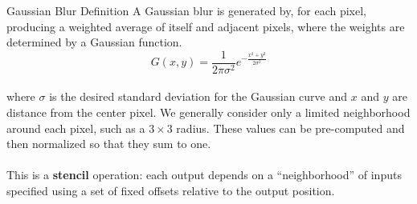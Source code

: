 \documentclass[xcolor=dvipsnames]{beamer}
\begin{document}
	\begin{frame}[t]{Gaussian Blur Definition}
		A Gaussian blur is generated by, for each pixel, producing a weighted average of itself and adjacent pixels, where the weights are determined by a Gaussian function.\\
		\begin{equation*}
			G(x,y) = \frac{1}{2\pi \sigma^2} e^{-\frac{x^2 + y^2}{2 \sigma^2}}
		\end{equation*}
		~\\
		where $\sigma$ is the desired standard deviation for the Gaussian curve and $x$ and $y$ are distance from the center pixel. We generally consider only a limited neighborhood around each pixel, such as a $3 \times 3$ radius. These values can be pre-computed and then normalized so that they sum to one.
		\\~\\
		This is a \textbf{stencil} operation: each output depends on a ``neighborhood'' of inputs specified using a set of fixed offsets relative to the output position.
	\end{frame}
\end{document}

